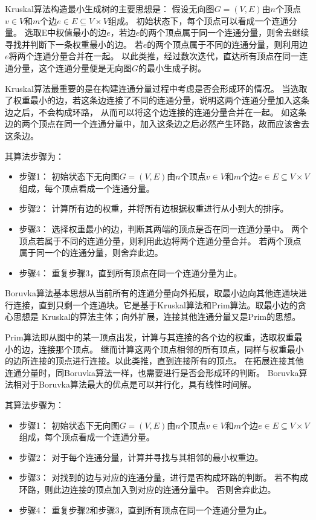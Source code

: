 Kruskal算法构造最小生成树的主要思想是：
假设无向图$G=(V,E)$由$n$个顶点$v\in V$和$m$个边$e\in E\subseteq V\times V$组成。
初始状态下，每个顶点可以看成一个连通分量。
选取E中权值最小的边$e$，若边$e$的两个顶点属于同一个连通分量，则舍去继续寻找并判断下一条权重最小的边。
若$e$的两个顶点属于不同的连通分量，则利用边$e$将两个连通分量合并在一起。
以此类推，经过数次迭代，直达所有顶点在同一连通分量，这个连通分量便是无向图$G$的最小生成子树。

Kruskal算法最重要的是在构建连通分量过程中考虑是否会形成环的情况。
当选取了权重最小的边，若这条边连接了不同的连通分量，说明这两个连通分量加入这条边之后，不会构成环路，
从而可以将这个边连接的连通分量合并在一起。
如这条边的两个顶点在同一个连通分量中，加入这条边之后必然产生环路，故而应该舍去这条边。

其算法步骤为：
\begin{itemize}
\item 步骤1： 初始状态下无向图$G=(V,E)$由$n$个顶点$v\in V$和$m$个边$e\in E\subseteq V\times V$组成，每个顶点看成一个连通分量。
\item 步骤2： 计算所有边的权重，并将所有边根据权重进行从小到大的排序。
\item 步骤3： 选择权重最小的边，判断其两端的顶点是否在同一连通分量中。
两个顶点若属于不同的连通分量，则利用此边将两个连通分量合并。
若两个顶点属于同一个的连通分量，则舍弃此边。
\item 步骤4： 重复步骤3，直到所有顶点在同一个连通分量为止。
\end{itemize}

Boruvka算法基本思想从当前所有的连通分量向外拓展，取最小边向其他连通块进行连接，直到只剩一个连通块。它是基于Kruskal算法和Prim算法。取最小边的贪心思想是 Kruskal的算法主体；向外扩展，连接其他连通分量又是Prim的思想。

Prim算法即从图中的某一顶点出发，计算与其连接的各个边的权重，选取权重最小的边，连接那个顶点。
继而计算这两个顶点相邻的所有顶点，同样与权重最小的边所连接的顶点进行连接。以此类推，直到连接所有的顶点。
在拓展连接其他连通分量时，同Boruvka算法一样，也需要进行是否会形成环的判断。
Boruvka算法相对于Boruvka算法最大的优点是可以并行化，具有线性时间解。

其算法步骤为：
\begin{itemize}
\item 步骤1： 初始状态下无向图$G=(V,E)$由$n$个顶点$v\in V$和$m$个边$e\in E\subseteq V\times V$组成，每个顶点看成一个连通分量。
\item 步骤2： 对于每个连通分量，计算并寻找与其相邻的最小权重边。
\item 步骤3： 对找到的边与对应的连通分量，进行是否构成环路的判断。
若不构成环路，则此边连接的顶点加入到对应的连通分量中。
否则舍弃此边。
\item 步骤4： 重复步骤2和步骤3，直到所有顶点在同一个连通分量为止。
\end{itemize}


